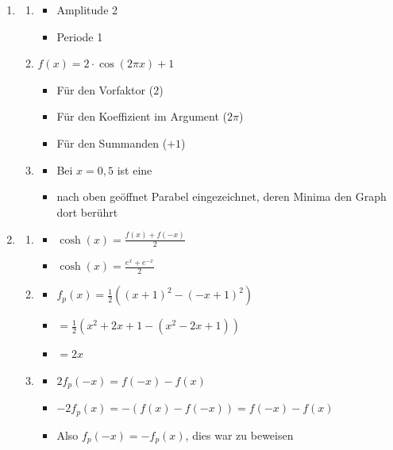\documentclass[12pt]{article}
\begin{document}
\begin{enumerate}

\item
\begin{enumerate}

\item
\begin{itemize}
\item Amplitude 2
\item Periode 1
\end{itemize}

\item $f(x) = 2\cdot\cos(2\pi x) + 1$
\begin{itemize}
\item Für den Vorfaktor ($2$)
\item Für den Koeffizient im Argument ($2\pi$)
\item Für den Summanden ($+1$)
\end{itemize}

\item 
\begin{itemize}
\item Bei $x=0{,}5$ ist eine
\item nach oben geöffnet Parabel eingezeichnet, deren Minima den Graph dort berührt
\end{itemize}

\end{enumerate}

\item
\begin{enumerate}

\item
\begin{itemize}
\item $\cosh(x) = \frac{f(x)+f(-x)}{2}$
\item $\cosh(x) = \frac{e^x+e^{-x}}{2}$
\end{itemize}

\item
\begin{itemize}
\item $f_p(x) = \frac{1}{2} ((x+1)^2-(-x+1)^2)$
\item $ = \frac{1}{2} (x^2+2x+1-(x^2-2x+1))$
\item $ = 2x$
\end{itemize}

\item
\begin{itemize}
\item $2f_p(-x) = f(-x)-f(x)$
\item $-2f_p(x) = -(f(x)-f(-x)) = f(-x)-f(x)$
\item Also $f_p(-x) = -f_p(x)$, dies war zu beweisen 
\end{itemize}


\end{enumerate}
\end{enumerate}
\end{document}
